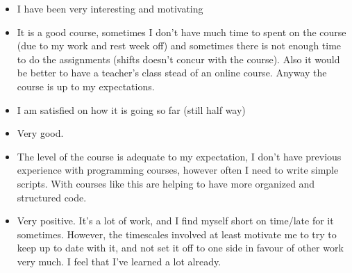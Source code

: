\documentclass[letter, 10pt]{article}
\begin{document}
\begin{itemize}
    \begin{itemize}
        \item I have been very interesting and motivating
        \item It is a good course, sometimes I don't have much time to spent on the course (due to my work and rest week off) and sometimes there is not enough time to do the assignments (shifts doesn't concur with the course). Also it would be better to have a teacher's class stead of an online course. Anyway the course is up to my expectations.
        \item I am satisfied on how it is going so far (still half way)
        \item Very good.
        \item The level of the course is adequate to my expectation, I don't have previous experience with programming courses, however often I need to write simple scripts. With courses like this are helping to have more organized and structured code.
        \item Very positive. It's a lot of work, and I find myself short on time/late for it sometimes. However, the timescales involved at least motivate me to try to keep up to date with it, and not set it off to one side in favour of other work very much. I feel that I've learned a lot already.
    \end{itemize}

\end{itemize}
\end{document}
